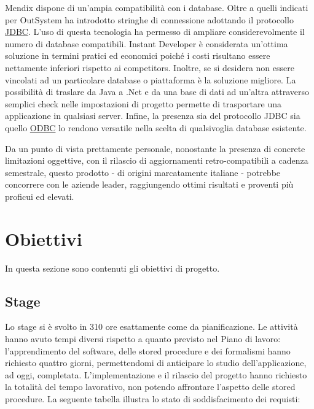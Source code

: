 Mendix dispone di un'ampia compatibilità con i database.  Oltre a quelli indicati per OutSystem ha introdotto stringhe di connessione adottando il protocollo \hyperref[JDBC]{JDBC}. L’uso di questa tecnologia ha permesso di ampliare considerevolmente il numero di database compatibili.
Instant Developer è considerata un’ottima soluzione in termini pratici ed economici poiché i costi risultano essere nettamente inferiori rispetto ai competitors. Inoltre, se si desidera non essere vincolati ad un particolare database o piattaforma è la soluzione migliore. La possibilità di traslare da Java a .Net e da una base di dati ad un’altra attraverso semplici check nelle impostazioni di progetto permette di trasportare una applicazione in qualsiasi server. Infine, la presenza sia del protocollo JDBC sia quello \hyperref[ODBC]{ODBC} lo rendono versatile nella scelta di qualsivoglia database esistente.

Da un punto di vista prettamente personale, nonostante la presenza di concrete limitazioni oggettive, con il rilascio di aggiornamenti retro-compatibili a cadenza semestrale, questo prodotto - di origini marcatamente italiane - potrebbe concorrere con le aziende leader, raggiungendo ottimi risultati e proventi più proficui ed elevati.




\section{Obiettivi}
In questa sezione sono contenuti gli obiettivi di progetto.

\subsection{Stage}
Lo stage si è svolto in 310 ore esattamente come da pianificazione. Le attività hanno avuto tempi diversi rispetto a quanto previsto nel Piano di lavoro: l'apprendimento del software, delle stored procedure e dei formalismi hanno richiesto quattro giorni, permettendomi di anticipare lo studio dell'applicazione, ad oggi, completata.  L'implementazione e il rilascio del progetto hanno richiesto la totalità del tempo lavorativo, non potendo affrontare l'aspetto delle stored procedure. 
La seguente tabella illustra lo stato di soddisfacimento dei requisti:


